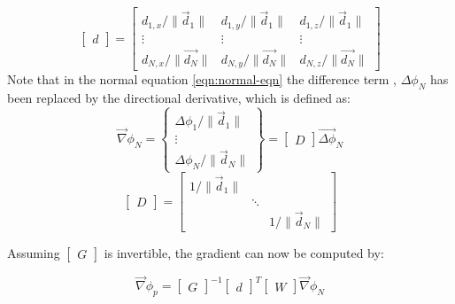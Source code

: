 \begin{equation}
	\begin{bmatrix}d\end{bmatrix} =
	\begin{bmatrix}
		d_{1,x}/\|\vec{d}_1\| & d_{1,y}/\|\vec{d}_1\| & d_{1,z}/\|\vec{d}_1\| \\
		\vdots & \vdots & \vdots \\
		d_{N,x}/\|\vec{d_N}\| & d_{N,y}/\|\vec{d_N}\| & d_{N,z}/\|\vec{d_N}\|
	\end{bmatrix}
\end{equation}
Note that in the normal equation \ref{eqn:normal-eqn} the difference term , $\Delta \phi_N$ has been replaced by the directional derivative, which is defined as:
\begin{equation}
 \vec{\nabla}\phi_N = 
	\begin{Bmatrix}
		\Delta \phi_1 / \|\vec{d}_1\|  \\
		\vdots \\
		 \Delta \phi_N / \|\vec{d}_N\|
	\end{Bmatrix} = 
	\begin{bmatrix}D\end{bmatrix}\vec{ \Delta\phi}_N
\end{equation}
\begin{equation}
	\begin{bmatrix}D\end{bmatrix} = 
		\begin{bmatrix}
		1 / \|\vec{d}_1\| & &\\
		 & \ddots &\\
		& & 1 / \|\vec{d}_N\|
	\end{bmatrix}
\end{equation}

\noindent Assuming $\begin{bmatrix}G\end{bmatrix}$ is invertible, the gradient can now be computed by:

\begin{equation}
  \vec{\nabla}\phi_p=\begin{bmatrix}G\end{bmatrix}^{-1}\begin{bmatrix}d\end{bmatrix}^{T} \begin{bmatrix}W\end{bmatrix}\vec{\nabla}\phi_N
  \label{eqn:least-squares-gradient-G-invertible}
\end{equation}

